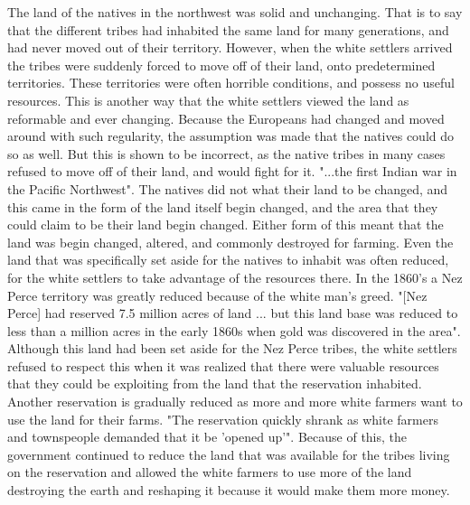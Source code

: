 \documentclass{article}
\begin{document}
The land of the natives in the northwest was solid and unchanging. That is to say that the different tribes had inhabited the same land for many generations, and had never moved out of their territory. However, when the white settlers arrived the tribes were suddenly forced to move off of their land, onto predetermined territories. These territories were often horrible conditions, and possess no useful resources. This is another way that the white settlers viewed the land as reformable and ever changing. Because the Europeans had changed and moved around with such regularity, the assumption was made that the natives could do so as well. But this is shown to be incorrect, as the native tribes in many cases refused to move off of their land, and would fight for it. "...the first Indian war in the Pacific Northwest"\cite{OHP}. The natives did not what their land to be changed, and this came in the form of the land itself begin changed, and the area that they could claim to be their land begin changed. Either form of this meant that the land was begin changed, altered, and commonly destroyed for farming. Even the land that was specifically set aside for the natives to inhabit was often reduced, for the white settlers to take advantage of the resources there. In the 1860's a Nez Perce territory was greatly reduced because of the white man's greed. "[Nez Perce] had reserved 7.5 million acres of land ... but this land base was reduced to less than a million acres in the early 1860s when gold was discovered in the area"\cite{OHP}. Although this land had been set aside for the Nez Perce tribes, the white settlers refused to respect this when it was realized that there were valuable resources that they could be exploiting from the land that the reservation inhabited. Another reservation is gradually reduced as more and more white farmers want to use the land for their farms. "The reservation quickly shrank as white farmers and townspeople demanded that it be 'opened up'"\cite{OHP}. Because of this, the government continued to reduce the land that was available for the tribes living on the reservation and allowed the white farmers to use more of the land destroying the earth and reshaping it because it would make them more money.
\par
\end{document}
